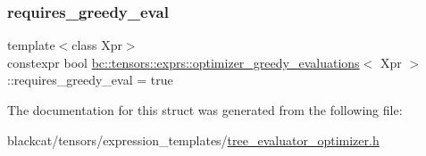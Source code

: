 \mbox{\label{structbc_1_1tensors_1_1exprs_1_1optimizer__greedy__evaluations_a064599222d4c50a96a709aca49632108}} 
\subsubsection{\texorpdfstring{requires\+\_\+greedy\+\_\+eval}{requires\_greedy\_eval}}
{\footnotesize\ttfamily template$<$class Xpr$>$ \\
constexpr bool \hyperlink{structbc_1_1tensors_1_1exprs_1_1optimizer__greedy__evaluations}{bc\+::tensors\+::exprs\+::optimizer\+\_\+greedy\+\_\+evaluations}$<$ Xpr $>$\+::requires\+\_\+greedy\+\_\+eval = true\hspace{0.3cm}{\ttfamily [static]}}



The documentation for this struct was generated from the following file\+:\begin{DoxyCompactItemize}
\item 
blackcat/tensors/expression\+\_\+templates/\hyperlink{tree__evaluator__optimizer_8h}{tree\+\_\+evaluator\+\_\+optimizer.\+h}\end{DoxyCompactItemize}
